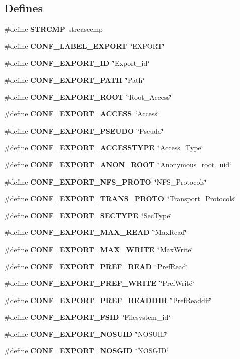 \subsection*{Defines}
\begin{CompactItemize}
\item 
\#define {\bf STRCMP}\ strcasecmp
\item 
\#define {\bf CONF\_\-LABEL\_\-EXPORT}\ \char`\"{}EXPORT\char`\"{}
\item 
\#define {\bf CONF\_\-EXPORT\_\-ID}\ \char`\"{}Export\_\-id\char`\"{}
\item 
\#define {\bf CONF\_\-EXPORT\_\-PATH}\ \char`\"{}Path\char`\"{}
\item 
\#define {\bf CONF\_\-EXPORT\_\-ROOT}\ \char`\"{}Root\_\-Access\char`\"{}
\item 
\#define {\bf CONF\_\-EXPORT\_\-ACCESS}\ \char`\"{}Access\char`\"{}
\item 
\#define {\bf CONF\_\-EXPORT\_\-PSEUDO}\ \char`\"{}Pseudo\char`\"{}
\item 
\#define {\bf CONF\_\-EXPORT\_\-ACCESSTYPE}\ \char`\"{}Access\_\-Type\char`\"{}
\item 
\#define {\bf CONF\_\-EXPORT\_\-ANON\_\-ROOT}\ \char`\"{}Anonymous\_\-root\_\-uid\char`\"{}
\item 
\#define {\bf CONF\_\-EXPORT\_\-NFS\_\-PROTO}\ \char`\"{}NFS\_\-Protocols\char`\"{}
\item 
\#define {\bf CONF\_\-EXPORT\_\-TRANS\_\-PROTO}\ \char`\"{}Transport\_\-Protocols\char`\"{}
\item 
\#define {\bf CONF\_\-EXPORT\_\-SECTYPE}\ \char`\"{}Sec\-Type\char`\"{}
\item 
\#define {\bf CONF\_\-EXPORT\_\-MAX\_\-READ}\ \char`\"{}Max\-Read\char`\"{}
\item 
\#define {\bf CONF\_\-EXPORT\_\-MAX\_\-WRITE}\ \char`\"{}Max\-Write\char`\"{}
\item 
\#define {\bf CONF\_\-EXPORT\_\-PREF\_\-READ}\ \char`\"{}Pref\-Read\char`\"{}
\item 
\#define {\bf CONF\_\-EXPORT\_\-PREF\_\-WRITE}\ \char`\"{}Pref\-Write\char`\"{}
\item 
\#define {\bf CONF\_\-EXPORT\_\-PREF\_\-READDIR}\ \char`\"{}Pref\-Readdir\char`\"{}
\item 
\#define {\bf CONF\_\-EXPORT\_\-FSID}\ \char`\"{}Filesystem\_\-id\char`\"{}
\item 
\#define {\bf CONF\_\-EXPORT\_\-NOSUID}\ \char`\"{}NOSUID\char`\"{}
\item 
\#define {\bf CONF\_\-EXPORT\_\-NOSGID}\ \char`\"{}NOSGID\char`\"{}

\end{CompactItemize}
